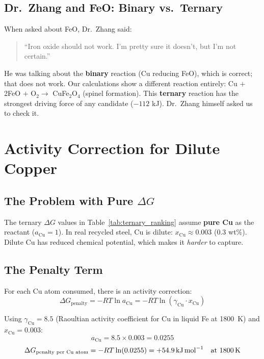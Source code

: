 \documentclass[11pt]{article}
\begin{document}
\subsection{Dr.\ Zhang and FeO: Binary vs.\ Ternary}

When asked about FeO, Dr.\ Zhang said:
\begin{quote}
``Iron oxide should not work. I'm pretty sure it doesn't, but I'm not certain.''
\end{quote}

He was talking about the \textbf{binary} reaction (Cu reducing FeO), which is correct; that does not work. Our calculations show a different reaction entirely: Cu $+$ 2FeO $+$ O$_2 \to$ CuFe$_2$O$_4$ (spinel formation). This \textbf{ternary} reaction has the strongest driving force of any candidate ($-112$ kJ). Dr.\ Zhang himself asked us to check it.


\section{Activity Correction for Dilute Copper}
\label{sec:activity_correction}

\subsection{The Problem with Pure $\Delta G$}

The ternary $\Delta G$ values in Table~\ref{tab:ternary_ranking} assume \textbf{pure Cu} as the reactant ($a_{\text{Cu}} = 1$). In real recycled steel, Cu is dilute: $x_{\text{Cu}} \approx 0.003$ (0.3 wt\%). Dilute Cu has reduced chemical potential, which makes it \textit{harder} to capture.

\subsection{The Penalty Term}

For each Cu atom consumed, there is an activity correction:
\begin{equation}
    \Delta G_{\text{penalty}} = -RT \ln a_{\text{Cu}} = -RT \ln(\gamma_{\text{Cu}} \cdot x_{\text{Cu}})
    \label{eq:penalty}
\end{equation}

Using $\gamma_{\text{Cu}} = 8.5$ (Raoultian activity coefficient for Cu in liquid Fe at \SI{1800}{\kelvin}) and $x_{\text{Cu}} = 0.003$:
\[
    a_{\text{Cu}} = 8.5 \times 0.003 = 0.0255
\]
\[
    \Delta G_{\text{penalty per Cu atom}} = -RT \ln(0.0255) = +\SI{54.9}{\kilo\joule\per\mole} \quad \text{at \SI{1800}{\kelvin}}
\]
\end{document}
